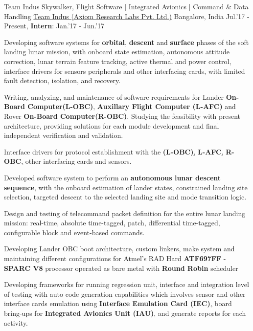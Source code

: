 \begin{cventries}
	\cventry
	{Team Indus Skywalker, Flight Software | Integrated Avionics | Command \& Data Handling}
	{\href{http://www.teamindus.in/}{Team Indus (Axiom Research Labs Pvt. Ltd.)}}
	{Bangalore, India}
	{Jul.'17 - Present, \textbf{Intern}: Jan.'17 - Jun.'17}
	{
		\begin{cvitems}
			\item{Developing software systems for \textbf{orbital}, \textbf{descent} and \textbf{surface} phases of the soft landing lunar mission, with onboard state estimation, autonomous attitude correction, lunar terrain feature tracking, active thermal and power control, interface drivers for sensors peripherals and other interfacing cards, with limited fault detection, isolation, and recovery.}
			\item{Writing, analyzing, and maintenance of software requirements for Lander \textbf{On-Board Computer(L-OBC)}, \textbf{Auxillary Flight Computer (L-AFC)} and Rover \textbf{On-Board Computer(R-OBC)}. Studying the feasibility with present architecture, providing solutions for each module development and final independent verification and validation.}
			\item{Interface drivers for protocol establishment with the \textbf{(L-OBC)}\href{http://ww1.microchip.com/downloads/en/DeviceDoc/ATF697FF.pdf}, \textbf{L-AFC}\href{http://zedboard.org/product/zedboard}, \textbf{R-OBC}\href{http://zedboard.org/product/zedboard}, other interfacing cards and sensors.}
			\item{Developed software system to perform an \textbf{autonomous lunar descent sequence}, with the onboard estimation of lander states, constrained landing site selection, targeted descent to the selected landing site and mode transition logic.}
			\item{Design and testing of telecommand packet definition for the entire lunar landing mission: real-time, absolute time-tagged, patch, differential time-tagged, configurable block and event-based commands.}
			\item{Developing Lander OBC boot architecture, custom linkers, make system and maintaining different configurations for Atmel's RAD Hard \textbf{ATF697FF} - \textbf{SPARC V8} processor operated as bare metal with \textbf{Round Robin} scheduler}
			\item{Developing frameworks for running regression unit, interface and integration level of testing with auto code generation capabilities which involves sensor and other interface cards emulation using \textbf{Interface Emulation Card (IEC)}\href{http://zedboard.org/product/microzed/}, board bring-ups for \textbf{Integrated Avionics Unit (IAU)}, and generate reports for each activity.}

\end{cvitems}}
\end{cventries}
